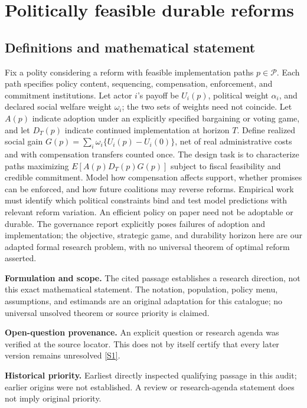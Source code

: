 \documentclass[11pt]{article}
\newcommand{\sref}[2]{\hyperlink{source:#1:#2}{[S#2]}}
\begin{document}
\section*{Politically feasible durable reforms}\label{30007671}
\subsection{Definitions and mathematical statement}
Fix a polity considering a reform with feasible implementation paths \(p\in\mathcal P\). Each path specifies policy content, sequencing, compensation, enforcement, and commitment institutions. Let actor \(i\)'s payoff be \(U_i(p)\), political weight \(\alpha_i\), and declared social welfare weight \(\omega_i\); the two sets of weights need not coincide. Let \(A(p)\) indicate adoption under an explicitly specified bargaining or voting game, and let \(D_T(p)\) indicate continued implementation at horizon \(T\). Define realized social gain \(G(p)=\sum_i\omega_i\{U_i(p)-U_i(0)\}\), net of real administrative costs and with compensation transfers counted once. The design task is to characterize paths maximizing \(E[A(p)D_T(p)G(p)]\) subject to fiscal feasibility and credible commitment. Model how compensation affects support, whether promises can be enforced, and how future coalitions may reverse reforms. Empirical work must identify which political constraints bind and test model predictions with relevant reform variation. An efficient policy on paper need not be adoptable or durable. The governance report explicitly poses failures of adoption and implementation; the objective, strategic game, and durability horizon here are our adapted formal research problem, with no universal theorem of optimal reform asserted.

\par\textbf{Formulation and scope.} The cited passage establishes a research direction, not this exact mathematical statement. The notation, population, policy menu, assumptions, and estimands are an original adaptation for this catalogue; no universal unsolved theorem or source priority is claimed.

\par\textbf{Open-question provenance.} An explicit question or research agenda was verified at the source locator. This does not by itself certify that every later version remains unresolved \sref{30007671}{1}.

\par\textbf{Historical priority.} Earliest directly inspected qualifying passage in this audit; earlier origins were not established. A review or research-agenda statement does not imply original priority.
\end{document}
